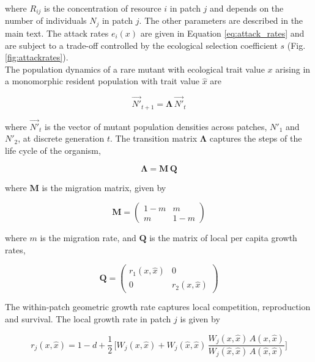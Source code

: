 where $R_{ij}$ is the concentration of resource $i$ in patch $j$ and depends on the number of individuals $N_j$ in patch $j$. The other parameters are described in the main text. The attack rates $e_i(x)$ are given in Equation \ref{eq:attack_rates} and are subject to a trade-off controlled by the ecological selection coefficient $s$ (Fig. \ref{fig:attackrates}).\\

The population dynamics of a rare mutant with ecological trait value $x$ arising in a monomorphic resident population with trait value $\hat{x}$ are

\begin{equation}
    \overrightarrow{N'}_{t+1} = \pmb{\Lambda} \, \overrightarrow{N'}_t
\end{equation}

where $\overrightarrow{N'}_t$ is the vector of mutant population densities across patches, $N'_1$ and $N'_2$, at discrete generation $t$. The transition matrix $\pmb{\Lambda}$ captures the steps of the life cycle of the organism,

\begin{equation}
    \pmb{\Lambda} = \pmb{M} \, \pmb{Q}
\end{equation}

where $\pmb{M}$ is the migration matrix, given by

\begin{equation}
    \pmb{M} =
    \begin{pmatrix}
        1-m & m \\
        m & 1-m 
    \end{pmatrix}
\end{equation}

where $m$ is the migration rate, and $\pmb{Q}$ is the matrix of local per capita growth rates,

\begin{equation}
    \pmb{Q} =
    \begin{pmatrix}
        r_1(x, \hat{x}) & 0 \\
        0 & r_2(x, \hat{x})
    \end{pmatrix}
\end{equation}

The within-patch geometric growth rate captures local competition, reproduction and survival. The local growth rate in patch $j$ is given by

\begin{equation}
    r_j(x, \hat{x}) = 1 - d + \frac{1}{2} \, \Bigg[ W_j(x, \hat{x}) + W_j(\hat{x}, \hat{x}) \, \frac{W_j(x, \hat{x})\,A(x,\hat{x})}{W_j(\hat{x}, \hat{x})\,A(\hat{x},\hat{x})}\Bigg]
    \label{eq:growth_rate}
\end{equation}

